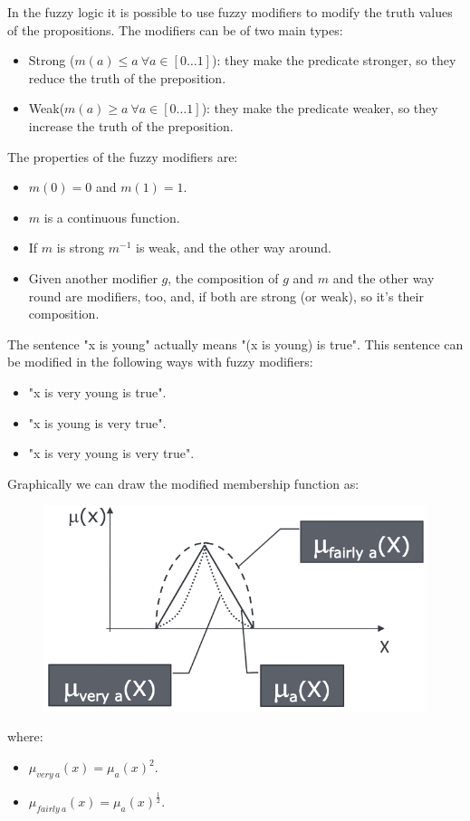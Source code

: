 \documentclass[12pt, a4paper]{report}
\begin{document}
    In the fuzzy logic it is possible to use fuzzy modifiers to modify the truth values of the propositions.     
    The modifiers can be of two main types: 
    \begin{itemize}
        \item Strong ($m(a) \leq a \: \forall a \in [0 \dots 1]$): they make the predicate stronger, so they reduce the truth of the preposition.
        \item Weak($m(a) \geq a \: \forall a \in [0 \dots 1]$): they make the predicate weaker, so they increase the truth of the preposition.
    \end{itemize}
    The properties of the fuzzy modifiers are:
    \begin{itemize}
        \item $m(0)=0$ and $m(1)=1$.
        \item $m$ is a continuous function. 
        \item If $m$ is strong $m^{-1}$ is weak, and the other way around.
        \item Given another modifier $g$, the composition of $g$ and $m$ and the other way round are modifiers, too, and, if both are strong
            (or weak), so it's their composition.
    \end{itemize}
    \begin{example}
        The sentence "x is young" actually means "(x is young) is true". This sentence can be modified in the following ways with fuzzy modifiers:
        \begin{itemize}
            \item "x is very young is true".
            \item "x is young is very true".
            \item "x is very young is very true". 
        \end{itemize}
        Graphically we can draw the modified membership function as: 
        \begin{figure}[H]
            \centering
            \includegraphics[width=0.4\linewidth]{images/modifiers.png}
        \end{figure}
        where: 
        \begin{itemize}
            \item $\mu_{very \: a}(x)=\mu_a(x)^2$.
            \item $\mu_{fairly \: a}(x)=\mu_a(x)^{\frac{1}{2}}$.
        \end{itemize}
    \end{example}
\end{document}
